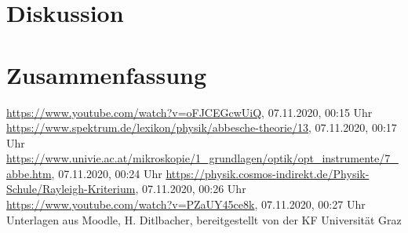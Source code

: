 \documentclass{article}
\begin{document}
\section{Diskussion}






\section{Zusammenfassung}








%

%


%


\begin{thebibliography}{9}
 \url{https://www.youtube.com/watch?v=oFJCEGcwUiQ}, 07.11.2020, 00:15 Uhr
 \url{https://www.spektrum.de/lexikon/physik/abbesche-theorie/13}, 07.11.2020, 00:17 Uhr
 \url{https://www.univie.ac.at/mikroskopie/1_grundlagen/optik/opt_instrumente/7_abbe.htm}, 07.11.2020, 00:24 Uhr
 \url{https://physik.cosmos-indirekt.de/Physik-Schule/Rayleigh-Kriterium}, 07.11.2020, 00:26 Uhr
 \url{https://www.youtube.com/watch?v=PZaUY45ce8k}, 07.11.2020, 00:27 Uhr
 Unterlagen aus Moodle, H. Ditlbacher, bereitgestellt von der KF Universität Graz
\end{thebibliography}
\end{document}
